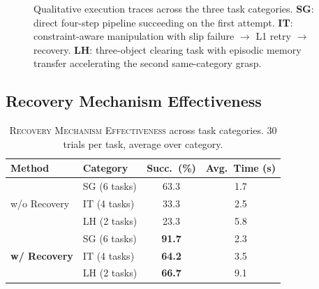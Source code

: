 \documentclass[letterpaper, 10pt, conference]{ieeeconf}
\begin{document}
\begin{figure}[t]
{
    }
    \caption{Qualitative execution traces across the three task categories. \textbf{SG}: direct four-step pipeline succeeding on the first attempt. \textbf{IT}: constraint-aware manipulation with slip failure $\to$ L1 retry $\to$ recovery. \textbf{LH}: three-object clearing task with episodic memory transfer accelerating the second same-category grasp.}
    \label{fig:qualitative}
\end{figure}

\subsection{Recovery Mechanism Effectiveness}
\label{sec:recovery_exp}

\begin{table}[t]
\centering
\caption{\textsc{Recovery Mechanism Effectiveness} across task categories. 30 trials per task, average over category.}
\label{tab:recovery}
\renewcommand{\arraystretch}{1.08}
\setlength{\tabcolsep}{3pt}
\begin{tabular}{@{}llcc@{}}
\toprule
\textbf{Method} & \textbf{Category} & \textbf{Succ.\ (\%)} & \textbf{Avg.\ Time (s)} \\
\midrule
\multirow{3}{*}{w/o Recovery} & SG (6 tasks) & 63.3 & 1.7 \\
 & IT (4 tasks) & 33.3 & 2.5 \\
 & LH (2 tasks) & 23.3 & 5.8 \\
\midrule
\multirow{3}{*}{\textbf{w/ Recovery}} & SG (6 tasks) & \textbf{91.7} & 2.3 \\
 & IT (4 tasks) & \textbf{64.2} & 3.5 \\
 & LH (2 tasks) & \textbf{66.7} & 9.1 \\
\bottomrule
\end{tabular}
\vspace{-2mm}
\end{table}
\end{document}
